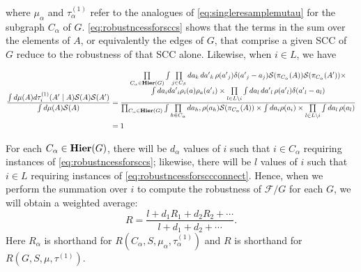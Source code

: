where $\mu_\alpha$ and $\tau^{(1)}_\alpha$ refer to the analogues of \ref{eq:singleresamplemutau} for the subgraph $C_\alpha$ of $G$. \ref{eq:robustncessforsccs} shows that the terms in the sum over the elements of $A$, or equivalently the edges of $G$, that comprise a given SCC of $G$ reduce to the robustness of that SCC alone.  Likewise, when $i \in L$, we have
\begin{widetext}
\begin{equation}\label{eq:robustncessforsccconnect}
\begin{aligned}
\frac{\int d\mu(A) d\tau^{(1)}_i (A' \mid A) \mathcal{S}(A) \mathcal{S}(A')}
       {\int d\mu(A) \mathcal{S}(A)}
&= \frac{\begin{matrix}
  \prod\limits_{C_\alpha \in \mathbf{Hier}(G)} \int
   \prod\limits_{j \in C_\beta} da_k\,d{a'}_k\, \rho({a'}_j) \delta ({a'}_j - a_j)
      \mathcal{S}(\pi_{C_\alpha}(A)) \mathcal{S}(\pi_{C_\alpha}(A')) \times \\
 \int da_i d{a'}_i \rho_i(a) \rho_a({a'}_i) \times
 \prod\limits_{l \in L\setminus i} \int da_l\,d{a'}_l\,\rho({a'}_l) \delta({a'}_l - a_l) \end{matrix}}
{\prod_{C_\alpha \in \mathbf{Hier}(G)}
   \int \prod\limits_{h \in C_\alpha} da_h,\rho(a_h) \mathcal{S}(\pi_{C_\alpha}(A)) \times
 \int da_i \rho(a_i) \times
 \prod\limits_{l \in L \setminus i} \int da_l\,\rho(a_l)} \\
&= 1
\end{aligned}
\end{equation}
\end{widetext}
For each $C_{\alpha} \in \mathbf{Hier}(G)$, there will be $d_\alpha$ values of $i$ such that $i \in C_{\alpha}$ requiring instances of \ref{eq:robustncessforsccs}; likewise, there will be $l$ values of $i$ such that $i \in L$ requiring instances of \ref{eq:robustncessforsccconnect}.  Hence, when we perform the summation over $i$ to compute the robustness of $\mathcal{F}/G$ for each $G$, we will obtain a weighted average:
\begin{equation}\label{eq:robschematic}
R = \frac{l+d_1 R_1 + d_2 R_2 + \cdots}{l+d_1 + d_2 + \cdots}.
\end{equation}
Here $R_\alpha$ is shorthand for $R(C_\alpha,S,\mu_\alpha,\tau^{(1)}_\alpha)$ and $R$ is shorthand for $R(G,S,\mu,\tau^{(1)})$.

